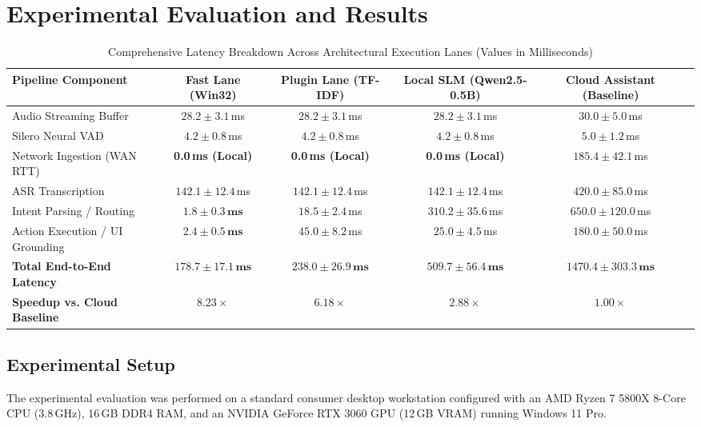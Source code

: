 \documentclass[conference]{IEEEtran}
\begin{document}
\section{Experimental Evaluation and Results}

\begin{table}[t]
\caption{Comprehensive Latency Breakdown Across Architectural Execution Lanes (Values in Milliseconds)}
\label{tab:latency_full}
\centering
\begin{tabular}{@{}lccccc@{}}
\toprule
\textbf{Pipeline Component} & \textbf{Fast Lane (Win32)} & \textbf{Plugin Lane (TF-IDF)} & \textbf{Local SLM (Qwen2.5-0.5B)} & \textbf{Cloud Assistant (Baseline)} \\
\midrule
Audio Streaming Buffer & $28.2 \pm 3.1$\,ms & $28.2 \pm 3.1$\,ms & $28.2 \pm 3.1$\,ms & $30.0 \pm 5.0$\,ms \\
Silero Neural VAD & $4.2 \pm 0.8$\,ms & $4.2 \pm 0.8$\,ms & $4.2 \pm 0.8$\,ms & $5.0 \pm 1.2$\,ms \\
Network Ingestion (WAN RTT) & \textbf{0.0\,ms (Local)} & \textbf{0.0\,ms (Local)} & \textbf{0.0\,ms (Local)} & $185.4 \pm 42.1$\,ms \\
ASR Transcription & $142.1 \pm 12.4$\,ms & $142.1 \pm 12.4$\,ms & $142.1 \pm 12.4$\,ms & $420.0 \pm 85.0$\,ms \\
Intent Parsing / Routing & $\mathbf{1.8 \pm 0.3\,\text{ms}}$ & $18.5 \pm 2.4$\,ms & $310.2 \pm 35.6$\,ms & $650.0 \pm 120.0$\,ms \\
Action Execution / UI Grounding & $\mathbf{2.4 \pm 0.5\,\text{ms}}$ & $45.0 \pm 8.2$\,ms & $25.0 \pm 4.5$\,ms & $180.0 \pm 50.0$\,ms \\
\midrule
\textbf{Total End-to-End Latency} & $\mathbf{178.7 \pm 17.1\,\text{ms}}$ & $\mathbf{238.0 \pm 26.9\,\text{ms}}$ & $\mathbf{509.7 \pm 56.4\,\text{ms}}$ & $\mathbf{1470.4 \pm 303.3\,\text{ms}}$ \\
\textbf{Speedup vs. Cloud Baseline} & $\mathbf{8.23\times}$ & $\mathbf{6.18\times}$ & $\mathbf{2.88\times}$ & $1.00\times$ \\
\bottomrule
\end{tabular}
\end{table}

\subsection{Experimental Setup}
The experimental evaluation was performed on a standard consumer desktop workstation configured with an AMD Ryzen 7 5800X 8-Core CPU (3.8\,GHz), 16\,GB DDR4 RAM, and an NVIDIA GeForce RTX 3060 GPU (12\,GB VRAM) running Windows 11 Pro. 
\end{document}
